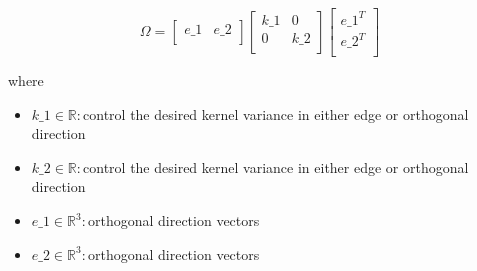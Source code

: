\documentclass[12pt]{article}
\begin{document}
\[
\textit{Ω} = \begin{bmatrix}
\textit{e\_1} & \textit{e\_2}\\
\end{bmatrix}\begin{bmatrix}
\textit{k\_1} & 0\\
0 & \textit{k\_2}\\
\end{bmatrix}\begin{bmatrix}
\textit{e\_1}^T\\
\textit{e\_2}^T\\
\end{bmatrix}
\]

where
\begin{itemize}
\item $\textit{k\_1} \in \mathbb{{R}}:$control the desired kernel variance in either edge or orthogonal direction
\item $\textit{k\_2} \in \mathbb{{R}}:$control the desired kernel variance in either edge or orthogonal direction
\item $\textit{e\_1} \in \mathbb{R}^{ 3}:$orthogonal direction vectors
\item $\textit{e\_2} \in \mathbb{R}^{ 3}:$orthogonal direction vectors
\end{itemize}
\end{document}
